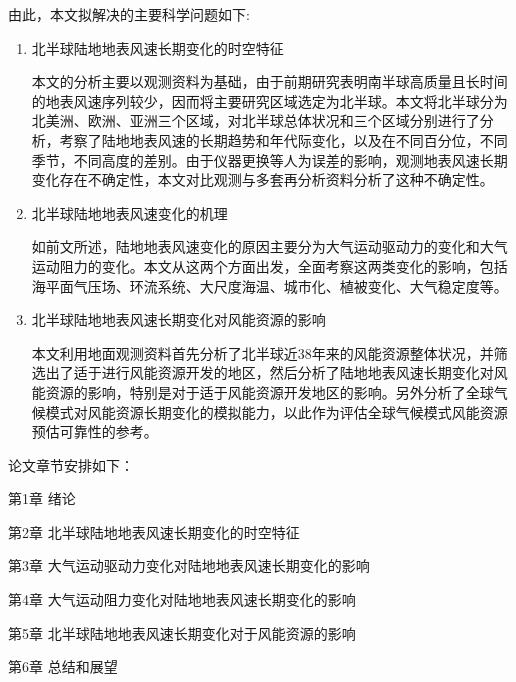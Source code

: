 由此，本文拟解决的主要科学问题如下:

\begin{enumerate}
\item 北半球陆地地表风速长期变化的时空特征

本文的分析主要以观测资料为基础，由于前期研究表明南半球高质量且长时间的地表风速序列较少，因而将主要研究区域选定为北半球。本文将北半球分为北美洲、欧洲、亚洲三个区域，对北半球总体状况和三个区域分别进行了分析，考察了陆地地表风速的长期趋势和年代际变化，以及在不同百分位，不同季节，不同高度的差别。由于仪器更换等人为误差的影响，观测地表风速长期变化存在不确定性，本文对比观测与多套再分析资料分析了这种不确定性。

\item 北半球陆地地表风速变化的机理

如前文所述，陆地地表风速变化的原因主要分为大气运动驱动力的变化和大气运动阻力的变化。本文从这两个方面出发，全面考察这两类变化的影响，包括海平面气压场、环流系统、大尺度海温、城市化、植被变化、大气稳定度等。

\item 北半球陆地地表风速长期变化对风能资源的影响

本文利用地面观测资料首先分析了北半球近38年来的风能资源整体状况，并筛选出了适于进行风能资源开发的地区，然后分析了陆地地表风速长期变化对风能资源的影响，特别是对于适于风能资源开发地区的影响。另外分析了全球气候模式对风能资源长期变化的模拟能力，以此作为评估全球气候模式风能资源预估可靠性的参考。

\end{enumerate}

论文章节安排如下：

第1章	\quad 绪论

第2章	\quad 北半球陆地地表风速长期变化的时空特征

第3章	\quad 大气运动驱动力变化对陆地地表风速长期变化的影响

第4章	\quad 大气运动阻力变化对陆地地表风速长期变化的影响

第5章	\quad 北半球陆地地表风速长期变化对于风能资源的影响

第6章	\quad 总结和展望
